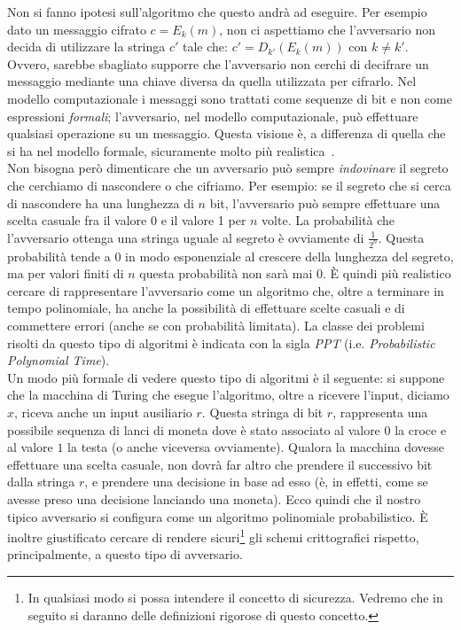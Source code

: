 \documentclass[a4paper,openright,twoside,12pt]{report}
\begin{document}
Non si fanno ipotesi sull'algoritmo che questo andr\`a ad eseguire.
Per esempio dato un messaggio cifrato $c=E_k(m)$, non ci aspettiamo che l'avversario non decida di utilizzare la stringa $c'$ tale che:  $c'=D_{k'}(E_k(m))$ con $k\neq k'$. 
Ovvero, sarebbe sbagliato supporre che l'avversario non cerchi di decifrare un messaggio mediante una chiave diversa 
da quella utilizzata per cifrarlo.
Nel modello computazionale i messaggi sono trattati come sequenze di bit e non come espressioni \emph{formali}; l'avversario, nel modello computazionale, pu\`o effettuare qualsiasi operazione su un messaggio. Questa visione \`e, a differenza di quella 
che si ha nel modello formale, sicuramente molto pi\`u realistica~\cite{DBLP:conf/crypto/2006}.\\

Non bisogna per\`o dimenticare che un avversario può sempre \emph{indovinare} il segreto che cerchiamo di nascondere o che cifriamo. 
Per esempio: se il segreto che si cerca di nascondere ha una lunghezza di $n$ bit, l'avversario pu\`o sempre effettuare una scelta casuale fra il valore 0 e il valore 1 per $n$ volte.
La probabilit\`a che l'avversario ottenga una stringa uguale al segreto \`e ovviamente di $\frac{1}{2^n}$. 
Questa probabilit\`a tende a 0 in modo esponenziale al crescere della lunghezza del segreto, ma per valori finiti di $n$ questa probabilit\`a non sar\`a mai 0.
\`E quindi pi\`u realistico cercare di rappresentare l'avversario come un algoritmo che, oltre a terminare in tempo polinomiale, ha
anche la possibilit\`a di effettuare scelte casuali e di commettere errori (anche se con probabilit\`a limitata).
La classe dei problemi risolti da questo tipo di algoritmi \`e indicata con la
sigla \emph{PPT} (i.e. \emph{Probabilistic Polynomial Time}).\\Un modo pi\`u formale di vedere questo tipo di algoritmi \`e il seguente: si suppone che la macchina di Turing che 
esegue l'algoritmo, oltre a ricevere l'input, diciamo $x$, riceva anche un input ausiliario $r$. Questa stringa di bit $r$, rappresenta una possibile sequenza di lanci di moneta dove \`e stato associato al valore $0$ la croce e al valore $1$ la testa (o anche viceversa ovviamente).
Qualora la macchina dovesse effettuare una scelta casuale, non dovr\`a far altro che prendere il successivo bit dalla stringa $r$, e prendere una decisione in base ad esso
(\`e, in effetti, come se avesse preso una decisione lanciando una moneta). Ecco quindi che il nostro tipico avversario si configura come un algoritmo polinomiale probabilistico.
\`E inoltre giustificato cercare di rendere sicuri\footnote{In qualsiasi modo si possa intendere il concetto di sicurezza. Vedremo che in seguito si daranno delle definizioni rigorose di questo concetto.} gli schemi crittografici rispetto, principalmente, a questo tipo di avversario.
\end{document}
